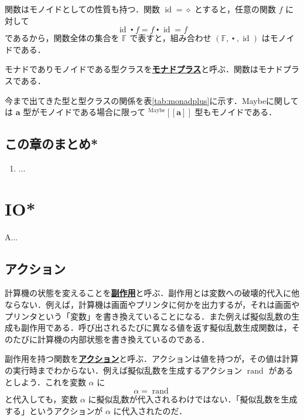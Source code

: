 \documentclass[a5paper,twoside,fleqn,draft]{jsbook}
\def\[{[\![}
\def\]{]\!]}
\newcommand{\keyword}[1]{{\underline{\textbf{#1}}}}
\newcommand{\mAnonParam}{\diamond}
\newcommand{\mSpecialFunc}[1]{\mathrm{#1}}
\DeclareMathOperator{\mId}{\mSpecialFunc{id}}
\newcommand{\mAction}[1]{\mathrm{#1}}
\DeclareMathOperator{\mRand}{\mAction{rand}}
\DeclareMathOperator{\mCompFunc}{\centerdot}
\newcommand{\mSpecialSet}[1]{\mathbb{#1}}
\newcommand{\mFSet}{\mSpecialSet{F}}
\newcommand{\mType}[1]{\mathbf{#1}} %
\newcommand{\mA}{\mType{a}}
\newcommand{\mTypeAssemble}[2]{{}^\mathrm{#1}\[\mType{#2}\]}
\newcommand{\mMaybeType}[1]{\mTypeAssemble{Maybe}{#1}}
\begin{document}
関数はモノイドとしての性質も持つ．関数 $\mId=\mAnonParam$ とすると，任意の関数 $f$ に対して
\begin{equation}
\mId\mCompFunc f=f\mCompFunc\mId=f
\end{equation}
であるから，関数全体の集合を $\mFSet$ で表すと，組み合わせ $(\mFSet,\mCompFunc,\mId)$ はモノイドである．

モナドでありモノイドである型クラスを\keyword{モナドプラス}と呼ぶ．関数はモナドプラスである．

今まで出てきた型と型クラスの関係を表\ref{tab:monadplus}に示す．Maybeに関しては $\mA $ 型がモノイドである場合に限って $\mMaybeType{a}$ 型もモノイドである．

\section{この章のまとめ*}

\begin{enumerate}
\item ...
\end{enumerate}


\chapter{IO*}
\label{ch:io}

A...

\section{アクション}

計算機の状態を変えることを\keyword{副作用}と呼ぶ．副作用とは変数への破壊的代入に他ならない．例えば，計算機は画面やプリンタに何かを出力するが，それは画面やプリンタという「変数」を書き換えていることになる．また例えば擬似乱数の生成も副作用である．呼び出されるたびに異なる値を返す擬似乱数生成関数は，そのたびに計算機の内部状態を書き換えているのである．

副作用を持つ関数を\keyword{アクション}と呼ぶ．アクションは値を持つが，その値は計算の実行時までわからない．例えば擬似乱数を生成するアクション $\mRand$ があるとしよう．これを変数 $\alpha$ に
\begin{equation}
\alpha=\mRand
\end{equation}
と代入しても，変数 $\alpha$ に擬似乱数が代入されるわけではない．「擬似乱数を生成する」というアクションが $\alpha$ に代入されたのだ．
\end{document}
